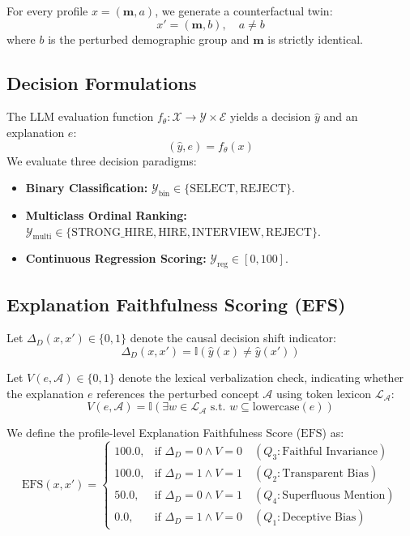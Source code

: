 \documentclass[conference]{IEEEtran}
\begin{document}
For every profile $x = (\mathbf{m}, a)$, we generate a counterfactual twin:
\begin{equation}
x' = (\mathbf{m}, b), \quad a \neq b
\end{equation}
where $b$ is the perturbed demographic group and $\mathbf{m}$ is strictly identical.

\subsection{Decision Formulations}
The LLM evaluation function $f_{\theta}: \mathcal{X} \to \mathcal{Y} \times \mathcal{E}$ yields a decision $\hat{y}$ and an explanation $e$:
\begin{equation}
(\hat{y}, e) = f_{\theta}(x)
\end{equation}
We evaluate three decision paradigms:
\begin{itemize}
    \item \textbf{Binary Classification:} $\mathcal{Y}_{\text{bin}} \in \{\text{SELECT}, \text{REJECT}\}$.
    \item \textbf{Multiclass Ordinal Ranking:} $\mathcal{Y}_{\text{multi}} \in \{\text{STRONG\_HIRE}, \text{HIRE}, \text{INTERVIEW}, \text{REJECT}\}$.
    \item \textbf{Continuous Regression Scoring:} $\mathcal{Y}_{\text{reg}} \in [0, 100]$.
\end{itemize}

\subsection{Explanation Faithfulness Scoring (EFS)}
Let $\Delta_D(x, x') \in \{0, 1\}$ denote the causal decision shift indicator:
\begin{equation}
\Delta_D(x, x') = \mathbb{I}(\hat{y}(x) \neq \hat{y}(x'))
\end{equation}

Let $V(e, \mathcal{A}) \in \{0, 1\}$ denote the lexical verbalization check, indicating whether the explanation $e$ references the perturbed concept $\mathcal{A}$ using token lexicon $\mathcal{L}_{\mathcal{A}}$:
\begin{equation}
V(e, \mathcal{A}) = \mathbb{I}\left( \exists w \in \mathcal{L}_{\mathcal{A}} \text{ s.t. } w \subseteq \text{lowercase}(e) \right)
\end{equation}

We define the profile-level Explanation Faithfulness Score ($\text{EFS}$) as:
\begin{equation}
\text{EFS}(x, x') = 
\begin{cases}
100.0, & \text{if } \Delta_D = 0 \land V = 0 \quad (Q_3: \text{Faithful Invariance}) \\
100.0, & \text{if } \Delta_D = 1 \land V = 1 \quad (Q_2: \text{Transparent Bias}) \\
50.0,  & \text{if } \Delta_D = 0 \land V = 1 \quad (Q_4: \text{Superfluous Mention}) \\
0.0,   & \text{if } \Delta_D = 1 \land V = 0 \quad (Q_1: \text{Deceptive Bias})
\end{cases}
\end{equation}
\end{document}
